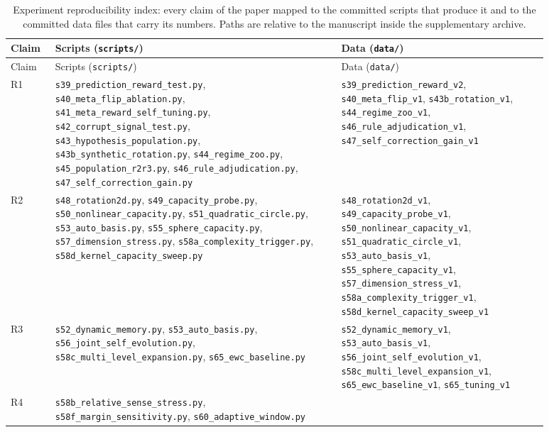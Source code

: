 \documentclass[preprint,12pt]{elsarticle}
\begin{document}
\begin{longtable}{@{}>{\footnotesize}p{0.07\linewidth}>{\footnotesize}p{0.47\linewidth}>{\footnotesize}p{0.34\linewidth}@{}}
\caption{Experiment reproducibility index: every claim of the
paper mapped to the committed scripts that produce it and to the committed
data files that carry its numbers. Paths are relative to the manuscript
inside the supplementary archive.}
\label{tab:reproindex}\\
\toprule
Claim & Scripts (\texttt{scripts/}) & Data (\texttt{data/}) \\
\midrule
\endfirsthead
\toprule
Claim & Scripts (\texttt{scripts/}) & Data (\texttt{data/}) \\
\midrule
\endhead
\bottomrule
\endlastfoot
R1 & \texttt{s39\_prediction\_reward\_test.py},
\texttt{s40\_meta\_flip\_ablation.py},
\texttt{s41\_meta\_reward\_self\_tuning.py},
\texttt{s42\_corrupt\_signal\_test.py},
\texttt{s43\_hypothesis\_population.py},
\texttt{s43b\_synthetic\_rotation.py}, \texttt{s44\_regime\_zoo.py},
\texttt{s45\_population\_r2r3.py}, \texttt{s46\_rule\_adjudication.py},
\texttt{s47\_self\_correction\_gain.py} &
\texttt{s39\_prediction\_reward\_v2},
\texttt{s40\_meta\_flip\_v1}, \texttt{s43b\_rotation\_v1},
\texttt{s44\_regime\_zoo\_v1}, \texttt{s46\_rule\_adjudication\_v1},
\texttt{s47\_self\_correction\_gain\_v1} \\
R2 & \texttt{s48\_rotation2d.py}, \texttt{s49\_capacity\_probe.py},
\texttt{s50\_nonlinear\_capacity.py}, \texttt{s51\_quadratic\_circle.py},
\texttt{s53\_auto\_basis.py}, \texttt{s55\_sphere\_capacity.py},
\texttt{s57\_dimension\_stress.py}, \texttt{s58a\_complexity\_trigger.py},
\texttt{s58d\_kernel\_capacity\_sweep.py} &
\texttt{s48\_rotation2d\_v1},
\texttt{s49\_capacity\_probe\_v1}, \texttt{s50\_nonlinear\_capacity\_v1},
\texttt{s51\_quadratic\_circle\_v1}, \texttt{s53\_auto\_basis\_v1},
\texttt{s55\_sphere\_capacity\_v1}, \texttt{s57\_dimension\_stress\_v1},
\texttt{s58a\_complexity\_trigger\_v1},
\texttt{s58d\_kernel\_capacity\_sweep\_v1} \\
R3 & \texttt{s52\_dynamic\_memory.py}, \texttt{s53\_auto\_basis.py},
\texttt{s56\_joint\_self\_evolution.py},
\texttt{s58c\_multi\_level\_expansion.py},
\texttt{s65\_ewc\_baseline.py} &
\texttt{s52\_dynamic\_memory\_v1}, \texttt{s53\_auto\_basis\_v1},
\texttt{s56\_joint\_self\_evolution\_v1},
\texttt{s58c\_multi\_level\_expansion\_v1},
\texttt{s65\_ewc\_baseline\_v1}, \texttt{s65\_tuning\_v1} \\
R4 & \texttt{s58b\_relative\_sense\_stress.py},
\texttt{s58f\_margin\_sensitivity.py}, \texttt{s60\_adaptive\_window.py} &

\end{longtable}
\end{document}
